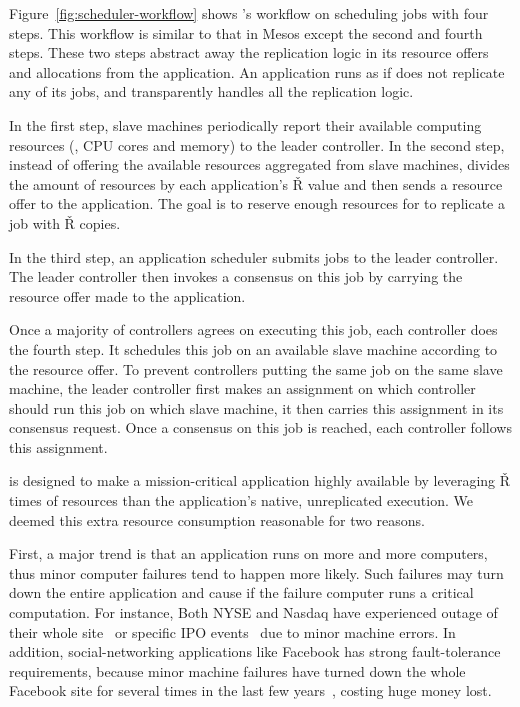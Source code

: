 Figure~\ref{fig:scheduler-workflow} shows \tripod's workflow on scheduling jobs 
with four steps. This workflow is similar to that in Mesos except the second 
and fourth steps. These two steps \tripod abstract away the replication logic 
in its resource offers and allocations from the application. An application runs 
as if \xxx does not replicate any of its jobs, and \tripod transparently 
handles all the replication logic.

In the first step, slave machines periodically report their available computing 
resources (\eg, CPU cores and memory) to the leader controller. In the second 
step, instead of offering the available resources aggregated from slave 
machines, \tripod divides the amount of resources by each application's \v{R} 
value and then sends a resource offer to the application. The goal is to 
reserve enough resources for \tripod to replicate a job with \v{R} copies.

In the third step, an application scheduler submits jobs to the leader 
controller. The leader controller then invokes a consensus on this job by 
carrying the resource offer made to the application.

Once a majority of controllers agrees on executing this job, each controller 
does the fourth step. It schedules this job on an available slave machine 
according to the resource offer. To prevent controllers putting the same job on 
the same slave machine, the leader controller first makes an assignment on 
which controller should run this job on which slave machine, it then carries 
this assignment in its consensus request. Once a consensus on this job is 
reached, each controller follows this assignment.



 \tripod is designed to make a
mission-critical application highly available by leveraging \v{R} times of 
resources than the application's native, unreplicated execution. We deemed this 
extra resource consumption reasonable for two reasons.

First, a major trend is that an application runs on more and more 
computers, thus minor computer failures tend to happen more likely. Such 
failures may turn down the entire application and cause if the failure computer 
runs a critical computation. For instance, Both NYSE and Nasdaq have experienced 
outage of their whole site~\cite{nyse:halt} or specific IPO 
events~\cite{facebook:ipo:delay} due to minor machine errors. 
In addition, social-networking applications like Facebook has 
strong fault-tolerance requirements, because minor machine failures have turned 
down the whole Facebook site for several times in the last few 
years~\cite{facebook:outage}, costing huge money lost. 

